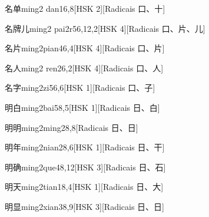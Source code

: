 \begin{entry}{名单}{ming2 dan1}{6,8}[HSK 2][Radicais ⼝、⼗]
\end{entry}

\begin{entry}{名牌儿}{ming2 pai2r5}{6,12,2}[HSK 4][Radicais ⼝、⽚、⼉]
\end{entry}

\begin{entry}{名片}{ming2pian4}{6,4}[HSK 4][Radicais ⼝、⽚]
\end{entry}

\begin{entry}{名人}{ming2 ren2}{6,2}[HSK 4][Radicais ⼝、⼈]
\end{entry}

\begin{entry}{名字}{ming2zi5}{6,6}[HSK 1][Radicais ⼝、⼦]
\end{entry}

\begin{entry}{明白}{ming2bai5}{8,5}[HSK 1][Radicais ⽇、⽩]
\end{entry}

\begin{entry}{明明}{ming2ming2}{8,8}[Radicais ⽇、⽇]
\end{entry}

\begin{entry}{明年}{ming2nian2}{8,6}[HSK 1][Radicais ⽇、⼲]
\end{entry}

\begin{entry}{明确}{ming2que4}{8,12}[HSK 3][Radicais ⽇、⽯]
\end{entry}

\begin{entry}{明天}{ming2tian1}{8,4}[HSK 1][Radicais ⽇、⼤]
\end{entry}

\begin{entry}{明显}{ming2xian3}{8,9}[HSK 3][Radicais ⽇、⽇]
\end{entry}

